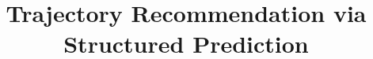 \documentclass[letterpaper]{article} %
\title{Trajectory Recommendation via Structured Prediction}
\begin{document}
\maketitle

\begin{abstract}

\end{abstract}


%






%


\fontsize{9.5pt}{10.5pt} \selectfont



\clearpage
\onecolumn

\end{document}
